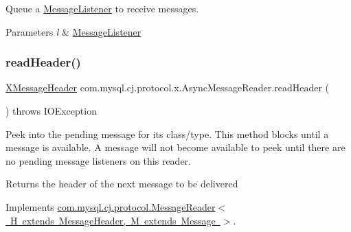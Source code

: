 Queue a \mbox{\hyperlink{interfacecom_1_1mysql_1_1cj_1_1protocol_1_1_message_listener}{Message\+Listener}} to receive messages.


\begin{DoxyParams}{Parameters}
{\em l} & \mbox{\hyperlink{interfacecom_1_1mysql_1_1cj_1_1protocol_1_1_message_listener}{Message\+Listener}} \\
\hline
\end{DoxyParams}
\mbox{\label{classcom_1_1mysql_1_1cj_1_1protocol_1_1x_1_1_async_message_reader_a6c755b53680af84a699114422348db84}} 
\subsubsection{\texorpdfstring{read\+Header()}{readHeader()}}
{\footnotesize\ttfamily \mbox{\hyperlink{classcom_1_1mysql_1_1cj_1_1protocol_1_1x_1_1_x_message_header}{X\+Message\+Header}} com.\+mysql.\+cj.\+protocol.\+x.\+Async\+Message\+Reader.\+read\+Header (\begin{DoxyParamCaption}{ }\end{DoxyParamCaption}) throws I\+O\+Exception}

Peek into the pending message for it\textquotesingle{}s class/type. This method blocks until a message is available. A message will not become available to peek until there are no pending message listeners on this reader.

\begin{DoxyReturn}{Returns}
the header of the next message to be delivered 
\end{DoxyReturn}


Implements \mbox{\hyperlink{interfacecom_1_1mysql_1_1cj_1_1protocol_1_1_message_reader_a09745b0e30f74fa13e2b32f22ce70cbb}{com.\+mysql.\+cj.\+protocol.\+Message\+Reader$<$ H extends Message\+Header, M extends Message $>$}}.

\mbox{\label{classcom_1_1mysql_1_1cj_1_1protocol_1_1x_1_1_async_message_reader_afd39b008eb7407f677e2e36f6ac640a6}} 
